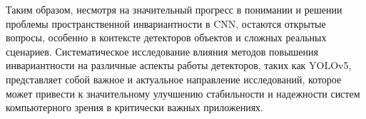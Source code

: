 Таким образом, несмотря на значительный прогресс в понимании и решении проблемы пространственной инвариантности в CNN, остаются открытые вопросы, особенно в контексте детекторов объектов и сложных реальных сценариев. Систематическое исследование влияния методов повышения инвариантности на различные аспекты работы детекторов, таких как YOLOv5, представляет собой важное и актуальное направление исследований, которое может привести к значительному улучшению стабильности и надежности систем компьютерного зрения в критически важных приложениях.
